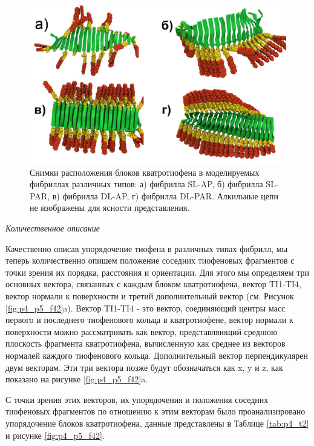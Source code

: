 \begin{figure} [H]
    \centering
    \includegraphics[width=\textwidth]{images/p4/punkt5/part4_p5_f41.pdf}
    \caption{Снимки расположения блоков кватротиофена в моделируемых фибриллах различных типов: а) фибрилла SL-AP, б) фибрилла SL-PAR, в) фибрилла DL-AP, г) фибрилла DL-PAR. Алкильные цепи не изображены для ясности представления.}
    \label{fig:p4_p5_f41}
\end{figure}

    \emph{Количественное описание}

    Качественно описав упорядочение тиофена в различных типах фибрилл, мы теперь количественно опишем положение соседних тиофеновых фрагментов с точки зрения их порядка, расстояния и ориентации. Для этого мы определяем три основных вектора, связанных с каждым блоком кватротиофена, вектор TI1-TI4, вектор нормали к поверхности и третий дополнительный вектор (см. Рисунок \ref{fig:p4_p5_f42}a). Вектор TI1-TI4 - это вектор, соединяющий центры масс первого и последнего тиофенового кольца в кватротиофене, вектор нормали к поверхности можно рассматривать как вектор, представляющий среднюю плоскость фрагмента кватротиофена, вычисленную как среднее из векторов нормалей каждого тиофенового кольца. Дополнительный вектор перпендикулярен двум векторам. Эти три вектора позже будут обозначаться как x, y и z, как показано на рисунке \ref{fig:p4_p5_f42}a.

    С точки зрения этих векторов, их упорядочения и положения соседних тиофеновых фрагментов по отношению к этим векторам было проанализировано упорядочение блоков кватротиофена, данные представлены в Таблице \ref{tab:p4_t2} и рисунке \ref{fig:p4_p5_f42}.

